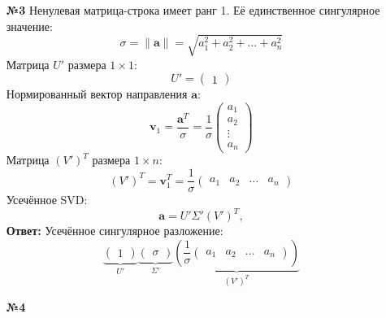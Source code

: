 \documentclass[a4paper]{article}
\begin{document}
\begin{enumerate}
  \item[\textbf{№3}]Ненулевая матрица-строка имеет ранг 1.
    Её единственное сингулярное значение:  
  \[
  \sigma = \|\mathbf{a}\| = \sqrt{a_1^2 + a_2^2 + \ldots + a_n^2}
  \]
  Матрица \( U' \) размера \( 1 \times 1 \):  
  \[
  U' = \begin{pmatrix} 1 \end{pmatrix}
  \]
  Нормированный вектор направления \( \mathbf{a} \):  
  \[
  \mathbf{v}_1 = \frac{\mathbf{a}^T}{\sigma} =
    \frac{1}{\sigma} \begin{pmatrix} a_1 \\ a_2 \\ \vdots \\ a_n \end{pmatrix}
  \]  
  Матрица \( (V')^T \) размера \( 1 \times n \):  
  \[
  (V')^T = \mathbf{v}_1^T = \frac{1}{\sigma} 
  \begin{pmatrix} a_1 & a_2 & \ldots & a_n \end{pmatrix}
  \]
  Усечённое SVD:
  \[
  \mathbf{a} = U' \Sigma' (V')^T,
  \]  
  \textbf{Ответ:} Усечённое сингулярное разложение:  
  \[
    \underbrace{\begin{pmatrix} 1 \end{pmatrix}}_{U'}
      \underbrace{\begin{pmatrix} \sigma \end{pmatrix}}_{\Sigma'}
      \underbrace{\left( \frac{1}{\sigma} 
      \begin{pmatrix} a_1 & a_2 & \ldots & a_n \end{pmatrix} \right)}_{(V')^T}
  \]

  \item[\textbf{№4}]

\end{enumerate}
\end{document}
